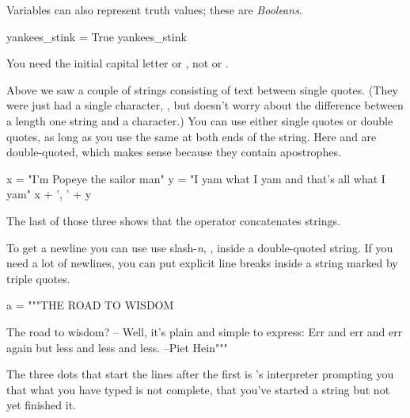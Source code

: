 
Variables can also represent truth values; these are \textit{Booleans}.
\begin{pythonconsole}
yankees_stink = True
yankees_stink
\end{pythonconsole}
\noindent You need the initial capital letter\Dash
{}
or , not
or .
 
Above we saw a couple of strings consisting of text between single quotes.
(They were just had a single character, ,
but \python{} doesn't worry about the difference between a length one
string and a character.)
You can use either single quotes or double quotes, as long as you use
the same at both ends of the string. 
Here  and 
are double-quoted, which makes sense because they contain apostrophes. 
\begin{pythonconsole}
x = "I'm Popeye the sailor man"
y = "I yam what I yam and that's all what I yam"
x + ', ' + y
\end{pythonconsole}
\noindent The last of those three shows that the \inlinecode{+} operator 
concatenates strings. 

To get a newline you can use use slash-\textit{n}, \inlinecode{\\n}, 
inside a double-quoted string.
If you need a lot of newlines, 
you can put explicit line breaks inside a string marked by triple quotes.
\begin{pythonconsole}
a = """THE ROAD TO WISDOM
 
The road to wisdom?
-- Well, it's plain
and simple to express:
Err
and err
and err again
but less
and less
and less. --Piet Hein"""
\end{pythonconsole}
\noindent 
The three dots that start the lines after the first
is \python's
interpreter prompting you that what you have typed is not complete,
that you've started a string but not yet finished it.


